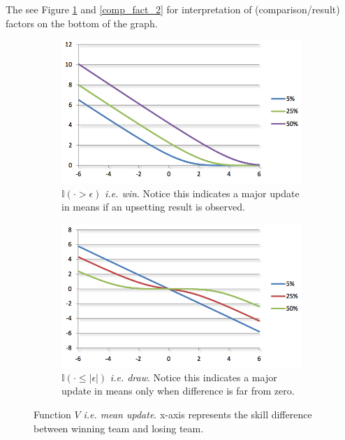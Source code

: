 \documentclass[12pt]{article}
\begin{document}
The see Figure \ref{comp_fact_1} and \ref{comp_fact_2} for interpretation of (comparison/result) factors on the bottom of the graph.


\begin{figure}[!ht]
	\begin{subfigure}{0.45\columnwidth}
		\centering
		\includegraphics[width=1\columnwidth]{11}
		\caption{$\mathbb{I}( \cdot > \epsilon)$ \textit{i.e. win}. Notice this indicates a major update in means if an upsetting result is observed.}		
	\end{subfigure}%
	\hfill
	\begin{subfigure}{.45\columnwidth}
		\centering
		\includegraphics[width=1\columnwidth]{12}
		\caption{$\mathbb{I}( \cdot \leq |\epsilon|)$ \textit{i.e. draw}. Notice this indicates a major update in means only when difference is far from zero.}
	\end{subfigure}
	
	\caption{Function $V$ \textit{i.e. mean update}. x-axis represents the skill difference between winning team and losing team.}
	\label{comp_fact_1}
\end{figure}
\end{document}
